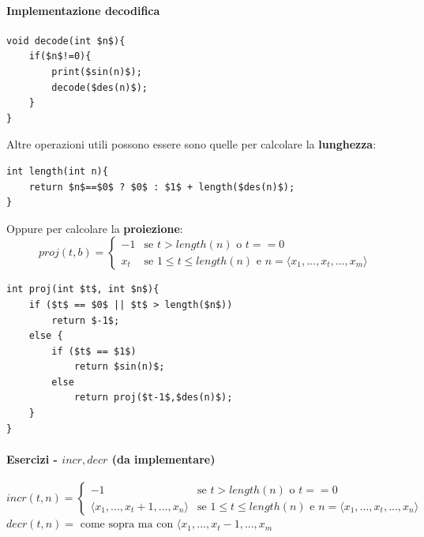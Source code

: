 \documentclass{article}
\begin{document}
\paragraph{Implementazione decodifica}\mbox{}
\begin{lstlisting}[mathescape=true]
void decode(int $n$){
    if($n$!=0){
        print($sin(n)$);
        decode($des(n)$);
    }
}
\end{lstlisting}

Altre operazioni utili possono essere sono quelle per calcolare la \textbf{lunghezza}:
\begin{lstlisting}[mathescape]
int length(int n){
    return $n$==$0$ ? $0$ : $1$ + length($des(n)$);
}
\end{lstlisting}
Oppure per calcolare la \textbf{proiezione}:
\[
    proj(t,b)=
    \begin{cases}
        -1  & \text{se } t>length(n)\text{ o }t==0                                           \\
        x_t & \text{se }1\leq t\leq length(n)\text{ e }n=\langle x_1,...,x_t,..., x_m\rangle
    \end{cases}
\]
\begin{lstlisting}[mathescape]
int proj(int $t$, int $n$){
    if ($t$ == $0$ || $t$ > length($n$))
        return $-1$;
    else {
        if ($t$ == $1$)
            return $sin(n)$;
        else
            return proj($t-1$,$des(n)$);
    }
}
\end{lstlisting}
\paragraph{Esercizi - $incr,decr$ (da implementare)}\mbox{}
\[incr(t,n)=
    \begin{cases}
        -1                                    & \text{se }t>length(n)\text{ o }t==0                                            \\
        \langle x_1, ...,x_t+1,...,x_n\rangle & \text{se } 1\leq t\leq length(n)\text{ e }n=\langle x_1,...,x_t,...,x_n\rangle
    \end{cases}
\]
$decr(t,n)=\text{ come sopra ma con }\langle x_1,...,x_t-1,...,x_m$
\end{document}
